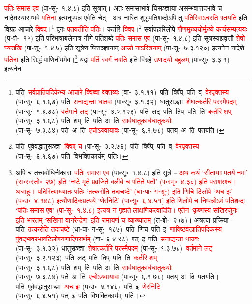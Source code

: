 \begin{sloppypar}
\textcolor{red}{पतिः समास एव} (पा॰सू॰~१.४.८) इति सूत्रात्। अतः समासाभावे घि\-सञ्ज्ञाया असम्भवात्तदभावे च नादेशस्यासम्भवे \textcolor{red}{पतिना} इत्यनुपपन्न एवेति चेत्। अत्र नास्ति शुद्ध\-पति\-शब्दोऽपि तु \textcolor{red}{पतिरिवाऽचरति पतयति} इति विग्रह आचारे \textcolor{red}{क्विप्}।\footnote{पति~\arrow \textcolor{red}{सर्वप्राति\-पदिकेभ्य आचारे क्विब्वा वक्तव्यः} (वा॰~३.१.११)~\arrow पति~क्विँप्~\arrow पति~व्~\arrow \textcolor{red}{वेरपृक्तस्य} (पा॰सू॰~६.१.६७)~\arrow पति~\arrow \textcolor{red}{सनाद्यन्ता धातवः} (पा॰सू॰~३.१.३२)~\arrow धातुसञ्ज्ञा~\arrow \textcolor{red}{शेषात्कर्तरि परस्मैपदम्} (पा॰सू॰~१.३.७८)~\arrow \textcolor{red}{वर्तमाने लट्} (पा॰सू॰~३.२.१२३)~\arrow पति~लट्~\arrow पति~तिप्~\arrow पति~ति~\arrow \textcolor{red}{कर्तरि शप्‌} (पा॰सू॰~३.१.६८)~\arrow पति~शप्~ति~\arrow पति~अ~ति~\arrow \textcolor{red}{सार्वधातुकार्ध\-धातुकयोः} (पा॰सू॰~७.३.८४)~\arrow पते~अ~ति~\arrow \textcolor{red}{एचोऽयवायावः} (पा॰सू॰~६.१.७८)~\arrow पतय्~अ~ति~\arrow पतयति।} पुनः \textcolor{red}{पतयतीति पतिः}। कर्तरि \textcolor{red}{क्विप्}।\footnote{पति~\arrow पूर्ववद्धातु\-सञ्ज्ञा~\arrow \textcolor{red}{क्विप् च} (पा॰सू॰~३.२.७६)~\arrow पति~क्विँप्~\arrow पति~व्~\arrow \textcolor{red}{वेरपृक्तस्य} (पा॰सू॰~६.१.६७)~\arrow पति~\arrow विभक्तिकार्यम्~\arrow पतिः।} सर्वापहारि\-लोपे \textcolor{red}{गौण\-मुख्ययोर्मुख्ये कार्य\-सम्प्रत्ययः} (प॰शे॰~१५) इति परिभाषा\-बलेनात्र गौणे पति\-शब्दे \textcolor{red}{पतिः समास एव} (पा॰सू॰~१.४.८) इति सूत्रस्याप्रवृत्तौ \textcolor{red}{शेषो घ्यसखि} (पा॰सू॰~१.४.७) इति सूत्रेण घि\-सञ्ज्ञायाम् \textcolor{red}{आङो नाऽस्त्रियाम्‌} (पा॰सू॰~७.३.१२०) इत्यनेन नादेशे \textcolor{red}{पतिना} इति सिद्धं पाणिनीयमेव।\footnote{अपि च तत्त्वबोधिनीकाराः \textcolor{red}{पतिः समास एव} (पा॰सू॰~१.४.८) इति सूत्रे – \textcolor{red}{अथ कथं ‘सीतायाः पतये नमः’ (रा॰र॰स्तो॰~२७) इति ‘नष्टे मृते प्रव्रजिते क्लीबे च पतिते पतौ’ (प॰स्मृ॰~४.३०) इति पराशरश्च। अत्राहुः। पतिरित्याख्यातः पतिः ‘तत्करोति तदाचष्टे’ (धा॰पा॰ ग॰सू॰) इति णिचि टिलोपे ‘अच इः’ (प॰उ॰~४.१४८) इत्यौणादिक\-प्रत्यये ‘णेरनिटि’ (पा॰सू॰~६.४.५१) इति णिलोपे च निष्पन्नोऽयं पतिशब्दः ‘पतिः समास एव’ (पा॰सू॰~१.४.८) इत्यत्र न गृह्यते लाक्षणिकत्वादिति। एतेन ‘कृष्णस्य सखिरर्जुनः’ इति भारतम् ‘सखिना वानरेन्द्रेण’ इति रामायणं च व्याख्यातम्‌} (त॰बो॰~२५७)। अत्रत्या प्रक्रिया~– पति~\arrow \textcolor{red}{तत्करोति तदाचष्टे} (धा॰पा॰ ग॰सू॰~१८७)~\arrow पति~णिच्~\arrow पति~इ~\arrow \textcolor{red}{णाविष्ठवत्प्राति\-पदिकस्य पुंवद्भाव\-रभाव\-टिलोप\-यणादि\-परार्थम्} (वा॰~६.४.४८)~\arrow पत्~इ~\arrow पति~\arrow \textcolor{red}{सनाद्यन्ता धातवः} (पा॰सू॰~३.१.३२)~\arrow धातुसञ्ज्ञा~\arrow \textcolor{red}{शेषात्कर्तरि परस्मैपदम्} (पा॰सू॰~१.३.७८)~\arrow \textcolor{red}{वर्तमाने लट्} (पा॰सू॰~३.२.१२३)~\arrow पति~लट्~\arrow पति~तिप्~\arrow पति~ति~\arrow \textcolor{red}{कर्तरि शप्‌} (पा॰सू॰~३.१.६८)~\arrow पति~शप्~ति~\arrow पति~अ~ति~\arrow \textcolor{red}{सार्वधातुकार्ध\-धातुकयोः} (पा॰सू॰~७.३.८४)~\arrow पते~अ~ति~\arrow \textcolor{red}{एचोऽयवायावः} (पा॰सू॰~६.१.७८)~\arrow पतय्~अ~ति~\arrow पतयति। पति~\arrow पूर्ववद्धातु\-सञ्ज्ञा~\arrow \textcolor{red}{अच इः} (प॰उ॰~४.१४८)~\arrow पति~इ~\arrow \textcolor{red}{णेरनिटि} (पा॰सू॰~६.४.५१)~\arrow पत्~इ~\arrow पति~\arrow विभक्तिकार्यम्~\arrow पतिः।} यद्वा \textcolor{red}{पतिं स्वर्गं नयति} इति विग्रहे \textcolor{red}{उणादयो बहुलम्‌} (पा॰सू॰~३.३.१) इत्यनेन 
\end{sloppypar}
